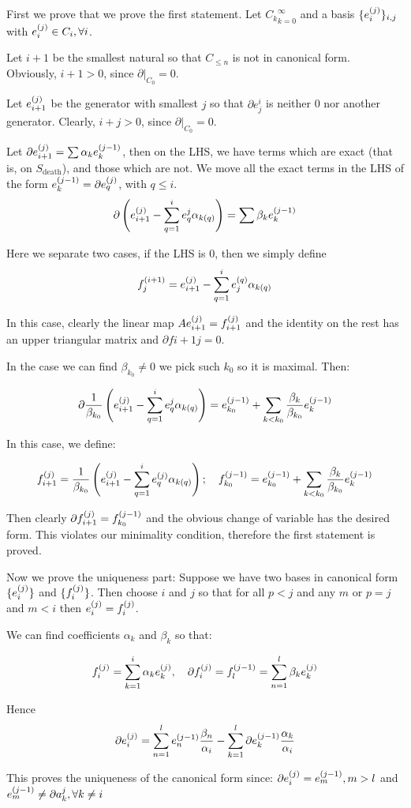 \begin{prof}
First we prove that we prove the first statement. 
Let ${C_k}_{k=0}^\infty$ 
and a basis $\{e_{i}^{(j)}\}_{i,j}$ 
with $e_{i}^{(j)}\in C_i,\forall i$.

Let $i+1$ be the smallest natural so that $C_{\leq n}$
is not in canonical form. Obviously, $i+1>0$, since $\partial | _{C_0}=0$.

Let $e_{i+1}^{(j)}$ be the generator with smallest $j$ so that $\partial e^i_j$
is neither 0 nor another generator. Clearly, $i+j>0$, since $\partial | _{C_0}=0$.

Let $\partial e_{i+1}^{(j)}=\sum \alpha_k e_{k}^{(j-1)}$, then on the LHS, we have terms which are exact (that is, on $S_{\text{death}}$),
and those which are not. We move all the exact terms in the LHS of the form $e_{k}^{(j-1)}=\partial e_{q}^{(j)}$, with $q\leq i$.
$$
\partial\left(
e_{i+1}^{(j)}
-
\sum_{q=1}^i
e^j_q\alpha_{k(q)}
\right)
=
\sum \beta_k e_{k}^{(j-1)}
$$

Here we separate two cases,
if the LHS is $0$, then we simply define 
$$
f_{j}^{(i+1)}=
e_{i+1}^{(j)}
-
\sum_{q=1}^i
e_{j}^{(q)}\alpha_{k(q)}
$$

In this case, clearly the linear map $A e_{i+1}^{(j)}=f_{i+1}^{(j)}$ and the identity on the rest 
has an upper triangular matrix and $\partial f{i+1}{j}=0$.

In the case we can find $\beta_{k_0}\neq 0 $ we pick such $k_0$ so it is maximal. Then:

$$
\partial
\frac{1}{\beta_{k_0}}
\left(
e_{i+1}^{(j)}
-
\sum_{q=1}^i
e^j_q\alpha_{k(q)}
\right)
=
e_{k_0}^{(j-1)}
+
\sum_{k<k_0} \frac{\beta_k}{\beta_{k_0}} e_{k}^{(j-1)}
$$

In this case, we define:

$$
f_{i+1}^{(j)}
=
\frac{1}{\beta_{k_0}}
\left(
e_{i+1}^{(j)}
-
\sum_{q=1}^i
e_{q}^{(j)}\alpha_{k(q)}
\right);
\quad
f_{k_{0}}^{(j-1)}
=
e_{k_0}^{(j-1)}
+
\sum_{k<k_0} \frac{\beta_k}{\beta_{k_0}} e_{k}^{(j-1)}
$$

Then clearly $\partial f_{i+1}^{(j)}=f_{k_0}^{(j-1)}$ and the obvious change of variable has the desired form.
This violates our minimality condition, therefore the first statement is proved.

Now we prove the uniqueness part: Suppose we have two bases in canonical form
$\{e_{i}^{(j)}\}$ and $\{f_{i}^{(j)}\}$. Then choose $i$ and $j$ so that for all $p<j$ and any $m$
or $p=j$ and $m<i$ then $e_{i}^{(j)}=f_{i}^{(j)}$. 

We can find coefficients $\alpha_k$ and $\beta_k$ so that:

$$
f_{i}^{(j)}
=
\sum_{k=1}^i \alpha_k e_{k}^{(j)},
\quad
\partial f_{i}^{(j)} = f_{l}^{(j-1)}
=
\sum_{n=1}^l \beta_k e_{k}^{(j)}
$$

Hence 
$$
\partial e_{i}^{(j)}=
\sum_{n=1}^l
e_{n}^{(j-1)}\frac{\beta_n}{\alpha_i}
-
\sum_{k=1}^l
\partial e_{k}^{(j-1)}\frac{\alpha_k}{\alpha_i}
$$

This proves the uniqueness of the canonical form since: $\partial e_{i}^{(j)}=e_{m}^{(j-1)},m>l$ and 
$e_{m}^{(j-1)}\neq \partial a_k^j, \forall k\neq i$
 
\end{prof}


